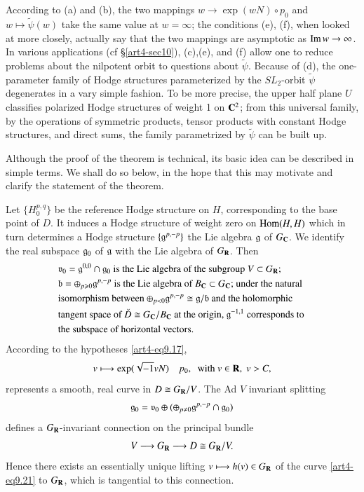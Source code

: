 According to (a) and (b), the two mappings $w \to \exp (w N) \circ p_0$ and $w \longmapsto \tilde{\psi} (w)$ take the same value at $w =\infty$; the conditions (e), (f), when looked at more closely, actually say that the two mappings are asymptotic as $\operatorname{Im}  w \to \infty$. In various applications (cf \S \ref{art4-sec10}), (c),\pageoriginale (e), and (f) allow one to reduce problems about the nilpotent orbit to questions about $\tilde{\psi}$. Because of (d), the one-parameter family of Hodge structures parameterized by the $SL_2$-orbit $\tilde{\psi}$ degenerates in a vary simple fashion. To be more precise, the upper half plane $U$ classifies polarized Hodge structures of weight 1 on $\mathbf{C}^2$; from this universal family, by the operations of symmetric products, tensor products with constant Hodge structures, and direct sums, the family parametrized by $\tilde{\psi}$ can be built up.

Although the proof of the theorem is technical, its basic idea can be described in simple terms. We shall do so below, in the hope that this may motivate and clarify the statement of the theorem.

Let $\{H^{p,q}_0\}$ be the reference Hodge structure on $H$, corresponding to the base point of $D$. It induces a Hodge structure of weight zero on $\operatorname{Hom} (H,H)$ which in turn determines a Hodge structure $\{\mathfrak{g}^{p,-p}\}$ the Lie algebra $\mathfrak{g}$ of $G_{\mathbf{C}}$. We identify the real subspace $\mathfrak{g}_0$ of $\mathfrak{g}$ with the Lie algebra of $G_{\mathbf{R}}$. Then
\setcounter{equation}{19}
\begin{align}
& \text{$\mathfrak{v}_0 = \mathfrak{g}^{0,0} \cap \mathfrak{g}_0$ is the Lie algebra of the subgroup $V \subset G_{\mathbf{R}}$;} \notag\\
& \text{$\mathfrak{b} = \oplus_{p \geqslant 0} \mathfrak{g}^{p,-p}$ is the Lie algebra of $B_{\mathbf{C}} \subset G_{\mathbf{C}}$; under the natural} \notag\\
& \text{isomorphism between $\oplus_{p<0} \mathfrak{g}^{p,-p} \cong \mathfrak{g}  / \mathfrak{b}$ and the holomorphic}\notag\\
& \text{tangent space of $\check{D} \cong G_{\mathbf{C}} / B_{\mathbf{C}}$ at the origin, $\mathfrak{g}^{-1,1}$ corresponds to } \notag\\
& \text{the subspace of horizontal vectors.} \label{art4-eq9.20}
\end{align}
According to the hypotheses \eqref{art4-eq9.17},
\begin{equation}
v \longmapsto  \exp (\sqrt{-1} v N)  \quad p_0, \;  \text{ with } v \in \mathbf{R}, \; v > C,  
\label{art4-eq9.21}
\end{equation}
represents a smooth, real curve in $D \cong G_{\mathbf{R}}/V$. The Ad $V$ invariant splitting
$$
\mathfrak{g}_0 = \mathfrak{v}_0 \oplus (\oplus_{p \neq 0} \mathfrak{g}^{p,-p} \cap \mathfrak{g}_0)
$$
defines a $G_{\mathbf{R}}$-invariant connection on the principal bundle
$$
V \longrightarrow G_{\mathbf{R}} \longrightarrow D \cong G_{\mathbf{R}} / V.
$$
Hence there exists an essentially unique lifting $v \longmapsto h (v) \in G_{\mathbf{R}}$ of the curve \eqref{art4-eq9.21} to $G_{\mathbf{R}}$, which is tangential to this connection.

